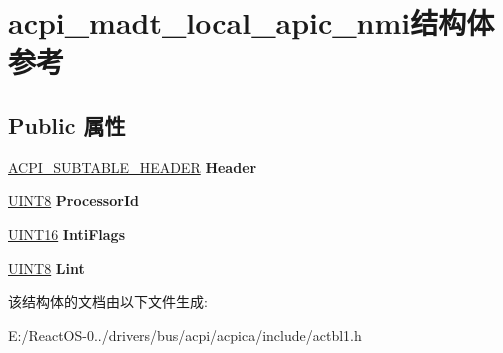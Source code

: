 \hypertarget{structacpi__madt__local__apic__nmi}{}\section{acpi\+\_\+madt\+\_\+local\+\_\+apic\+\_\+nmi结构体 参考}
\label{structacpi__madt__local__apic__nmi}
\subsection*{Public 属性}
\begin{DoxyCompactItemize}
\item 
\mbox{\label{structacpi__madt__local__apic__nmi_a50f4505013907d5e8d78844f04080d31}} 
\hyperlink{structacpi__subtable__header}{A\+C\+P\+I\+\_\+\+S\+U\+B\+T\+A\+B\+L\+E\+\_\+\+H\+E\+A\+D\+ER} {\bfseries Header}
\item 
\mbox{\label{structacpi__madt__local__apic__nmi_a597fe03ca1280c3ec2d81cb6bed5bbf3}} 
\hyperlink{_processor_bind_8h_ab27e9918b538ce9d8ca692479b375b6a}{U\+I\+N\+T8} {\bfseries Processor\+Id}
\item 
\mbox{\label{structacpi__madt__local__apic__nmi_a88771bef40b448cc64941748f23ac438}} 
\hyperlink{_processor_bind_8h_a09f1a1fb2293e33483cc8d44aefb1eb1}{U\+I\+N\+T16} {\bfseries Inti\+Flags}
\item 
\mbox{\label{structacpi__madt__local__apic__nmi_af0a73c207a7749a09247fb85d1e3b0eb}} 
\hyperlink{_processor_bind_8h_ab27e9918b538ce9d8ca692479b375b6a}{U\+I\+N\+T8} {\bfseries Lint}
\end{DoxyCompactItemize}


该结构体的文档由以下文件生成\+:\begin{DoxyCompactItemize}
\item 
E\+:/\+React\+O\+S-\/0../drivers/bus/acpi/acpica/include/actbl1.\+h\end{DoxyCompactItemize}
